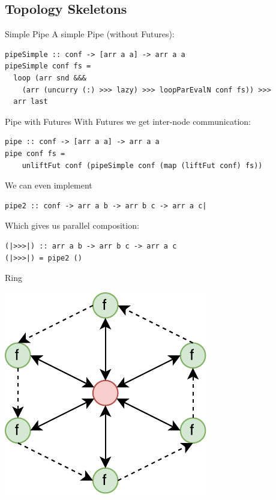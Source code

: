 \subsection{Topology Skeletons}
\begin{frame}[fragile]{Simple Pipe}
A simple Pipe (without Futures):
\begin{lstlisting}[frame=htrbl]
pipeSimple :: conf -> [arr a a] -> arr a a
pipeSimple conf fs =
  loop (arr snd &&&
    (arr (uncurry (:) >>> lazy) >>> loopParEvalN conf fs)) >>>
  arr last
\end{lstlisting}
\end{frame}
\begin{frame}[fragile]{Pipe with Futures}
With Futures we get inter-node communication:
\begin{lstlisting}[frame=htrbl]
pipe :: conf -> [arr a a] -> arr a a
pipe conf fs =
	unliftFut conf (pipeSimple conf (map (liftFut conf) fs))
\end{lstlisting}
We can even implement
\begin{lstlisting}[frame=htrbl]
pipe2 :: conf -> arr a b -> arr b c -> arr a c|
\end{lstlisting}
Which gives us parallel composition:
\begin{lstlisting}[frame=htrbl]
(|>>>|) :: arr a b -> arr b c -> arr a c
(|>>>|) = pipe2 ()
\end{lstlisting}
\end{frame}
\begin{frame}[fragile]{Ring}
\begin{center}
\includegraphics[scale=0.8]{images/ring.pdf}
\end{center}
\end{frame}
